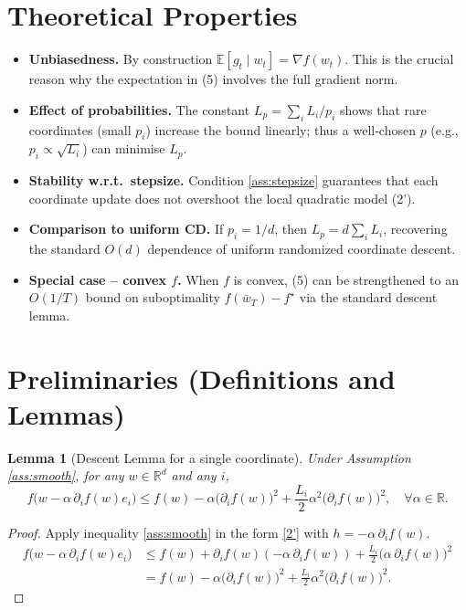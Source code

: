 \documentclass{article}
\newtheorem{lemma}{Lemma}[section]
\begin{document}
\section*{Theoretical Properties}
\begin{itemize}
\item \textbf{Unbiasedness.} By construction $\mathbb{E}[g_t\mid w_t]=\nabla f(w_t)$. This is the crucial reason why the expectation in (5) involves the full gradient norm.
\item \textbf{Effect of probabilities.} The constant $L_{p}=\sum_{i}L_i/p_i$ shows that rare coordinates (small $p_i$) increase the bound linearly; thus a well‑chosen $p$ (e.g., $p_i\propto\sqrt{L_i}$) can minimise $L_{p}$.
\item \textbf{Stability w.r.t.\ stepsize.} Condition \eqref{ass:stepsize} guarantees that each coordinate update does not overshoot the local quadratic model (2').
\item \textbf{Comparison to uniform CD.} If $p_i=1/d$, then $L_{p}=d\sum_i L_i$, recovering the standard $O(d)$ dependence of uniform randomized coordinate descent.
\item \textbf{Special case – convex $f$.} When $f$ is convex, (5) can be strengthened to an $O(1/T)$ bound on suboptimality $f(\bar w_T)-f^{\star}$ via the standard descent lemma.
\end{itemize}

\section*{Preliminaries (Definitions and Lemmas)}
\begin{lemma}[Descent Lemma for a single coordinate]\label{lem:descent}
Under Assumption \ref{ass:smooth}, for any $w\in\mathbb{R}^{d}$ and any $i$,
\[
f\!\bigl(w-\alpha\,\partial_i f(w)e_i\bigr)
\le
f(w)-\alpha\bigl(\partial_i f(w)\bigr)^{2}
+\frac{L_i}{2}\alpha^{2}\bigl(\partial_i f(w)\bigr)^{2},
\quad\forall\alpha\in\mathbb{R}.
\tag{6}
\]
\end{lemma}
\begin{proof}
Apply inequality \eqref{ass:smooth} in the form \eqref{2'} with $h=-\alpha\,\partial_i f(w)$.
\[
\begin{aligned}
f\!\bigl(w-\alpha\,\partial_i f(w)e_i\bigr)
&\le f(w)+\partial_i f(w)(-\alpha\,\partial_i f(w))
   +\frac{L_i}{2}\bigl(\alpha\,\partial_i f(w)\bigr)^{2}\\
&=f(w)-\alpha\bigl(\partial_i f(w)\bigr)^{2}
   +\frac{L_i}{2}\alpha^{2}\bigl(\partial_i f(w)\bigr)^{2}.
\end{aligned}
\]
\end{proof}
\end{document}
